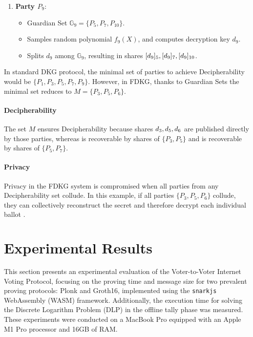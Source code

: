 \documentclass[runningheads]{llncs}
\begin{document}
\begin{enumerate}
    \item \textbf{Party $P_9$}:
    \begin{itemize}
        \item Guardian Set $\mathbb{G}_9 = \{P_5, P_7, P_{10}\}$.
        \item Samples random polynomial $f_9(X)$, and computes decryption key $d_9$.
        \item Splits $d_9$ among $\mathbb{G}_9$, resulting in shares $[d_{9}]_{5}, [d_{9}]_{7}, [d_{9}]_{10}$.
    \end{itemize}
\end{enumerate}

In standard DKG protocol, the minimal set of parties to achieve Decipherability would be \(\{P_1, P_3, P_5, P_7, P_9 \}\). However, in FDKG, thanks to Guardian Sets the minimal set reduces to \(M = \{P_3, P_5, P_6\}\).

\paragraph{Decipherability}
The set $M$ ensures Decipherability because shares $d_{3},d_{5},d_{6}$ are published directly by those parties, whereas  is recoverable by shares of \(\{P_3, P_5\}\) and  is recoverable by shares of \(\{P_5, P_7\}\).

\paragraph{Privacy}
Privacy in the FDKG system is compromised when all parties from any Decipherability set collude. In this example, if all parties \(\{P_3, P_5, P_6\}\) collude, they can collectively reconstruct the secret \DecryptionKey and therefore decrypt each individual ballot .


\section{Experimental Results}

This section presents an experimental evaluation of the Voter-to-Voter Internet Voting Protocol, focusing on the proving time and message size for two prevalent proving protocols: Plonk and Groth16, implemented using the \texttt{snarkjs} WebAssembly (WASM) framework. Additionally, the execution time for solving the Discrete Logarithm Problem (DLP) in the offline tally phase was measured. These experiments were conducted on a MacBook Pro equipped with an Apple M1 Pro processor and 16GB of RAM.
\end{document}
